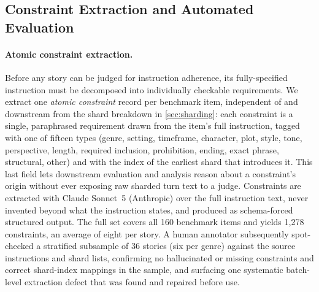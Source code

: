 \subsection{Constraint Extraction and Automated Evaluation}
\label{sec:constraints}

\paragraph{Atomic constraint extraction.} Before any story can be judged for instruction adherence, its fully-specified instruction must be decomposed into individually checkable requirements. We extract one \textit{atomic constraint} record per benchmark item, independent of and downstream from the shard breakdown in \cref{sec:sharding}: each constraint is a single, paraphrased requirement drawn from the item's full instruction, tagged with one of fifteen types (genre, setting, timeframe, character, plot, style, tone, perspective, length, required inclusion, prohibition, ending, exact phrase, structural, other) and with the index of the earliest shard that introduces it. This last field lets downstream evaluation and analysis reason about a constraint's origin without ever exposing raw sharded turn text to a judge. Constraints are extracted with Claude Sonnet~5 (Anthropic) over the full instruction text, never invented beyond what the instruction states, and produced as schema-forced structured output. The full set covers all 160 benchmark items and yields 1{,}278 constraints, an average of eight per story. A human annotator subsequently spot-checked a stratified subsample of 36 stories (six per genre) against the source instructions and shard lists, confirming no hallucinated or missing constraints and correct shard-index mappings in the sample, and surfacing one systematic batch-level extraction defect that was found and repaired before use.

